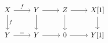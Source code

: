 \documentclass[12pt]{standalone}
\begin{document}
        $$

\begin{tikzcd}
    X \ar[r,"f"] \ar[d,"f"] & Y \ar[r] \ar[d] & Z \ar[r] \ar[d] & X[1] \ar[d] \\
    Y \ar[r,"="] & Y \ar[r] & 0 \ar[r] & Y[1]
\end{tikzcd}
        $$
        
\end{document}
